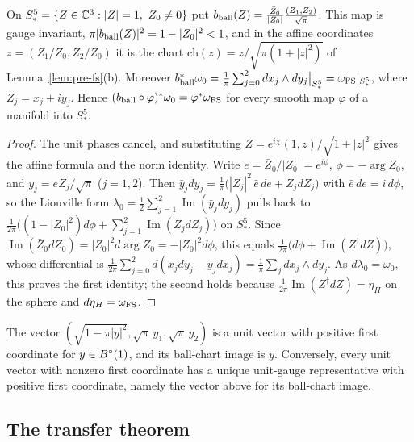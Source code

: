 \begin{lemma}\label{lem:rtc-ball-chart}
On $S^5_*=\{Z\in\mathbb{C}^3:|Z|=1,\ Z_0\ne0\}$ put $b_{\rm ball}(Z)=\frac{\bar Z_0}{|Z_0|}\frac{(Z_1,Z_2)}{\sqrt\pi}$. This map is gauge
invariant, $\pi|b_{\rm ball}(Z)|^2=1-|Z_0|^2<1$, and in the affine coordinates $z=(Z_1/Z_0,Z_2/Z_0)$ it is the chart
$\mathrm{ch}(z)=z/\sqrt{\pi(1+|z|^2)}$ of Lemma~\ref{lem:pre-fs}(b). Moreover
$b_{\rm ball}^*\omega_0=\frac1\pi\sum_{j=0}^2dx_j\wedge dy_j\big|_{S^5_*}=\omega_{\rm FS}|_{S^5_*}$, where $Z_j=x_j+iy_j$. Hence
$(b_{\rm ball}\circ\varphi)^*\omega_0=\varphi^*\omega_{\rm FS}$ for every smooth map $\varphi$ of a manifold into $S^5_*$.
\end{lemma}

\begin{proof}
The unit phases cancel, and substituting $Z=e^{i\chi}(1,z)/\sqrt{1+|z|^2}$ gives the affine formula and the norm identity.
Write $e=\bar Z_0/|Z_0|=e^{i\phi}$, $\phi=-\arg Z_0$, and $y_j=eZ_j/\sqrt\pi$ ($j=1,2$). Then
$\bar y_jdy_j=\frac1\pi\big(|Z_j|^2\,\bar e\,de+\bar Z_jdZ_j\big)$ with $\bar e\,de=i\,d\phi$, so the Liouville form
$\lambda_0=\frac12\sum_{j=1}^2\operatorname{Im}(\bar y_jdy_j)$ pulls back to
$\frac1{2\pi}\big((1-|Z_0|^2)d\phi+\sum_{j=1}^2\operatorname{Im}(\bar Z_jdZ_j)\big)$ on $S^5_*$. Since
$\operatorname{Im}(\bar Z_0dZ_0)=|Z_0|^2d\arg Z_0=-|Z_0|^2d\phi$, this equals $\frac1{2\pi}\big(d\phi+\operatorname{Im}(Z^\dagger dZ)\big)$, whose
differential is $\frac1{2\pi}\sum_{j=0}^2d(x_jdy_j-y_jdx_j)=\frac1\pi\sum_jdx_j\wedge dy_j$. As $d\lambda_0=\omega_0$, this proves the first
identity; the second holds because $\frac1{2\pi}\operatorname{Im}(Z^\dagger dZ)=\eta_H$ on the sphere and $d\eta_H=\omega_{\rm FS}$.
\end{proof}

The vector
$(\sqrt{1-\pi|y|^2},\sqrt\pi\,y_1,\sqrt\pi\,y_2)$ is a unit vector with positive first coordinate for $y\in B^{\circ}(1)$,
and its ball-chart image is $y$. Conversely, every unit vector with nonzero first coordinate has a unique
unit-gauge representative with positive first coordinate, namely the vector above for its ball-chart image.

\subsection{The transfer theorem}\label{sec:rtc-transfer}


